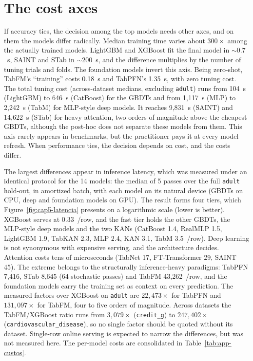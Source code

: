 \section{The cost axes}
\label{sec:cap5-ato2}
\label{sec:cap5-custos}

If accuracy ties, the decision among the top models needs other axes,
and on them the models differ radically. Median training
time varies about $300\times$ among the actually trained models. LightGBM and XGBoost fit the final model in ${\sim}0.7$~s,
SAINT and STab in ${\sim}200$~s, and the difference multiplies by the
number of tuning trials and folds. The foundation models invert this
axis. Being zero-shot, TabFM's ``training'' costs 0.18~s
and TabPFN's 1.35~s, with zero tuning cost. The total tuning cost
(across-dataset medians, excluding \texttt{adult}) runs from
104~s (LightGBM) to 646~s (CatBoost) for the GBDTs and from 1{,}117~s
(MLP) to 2{,}242~s (TabM) for MLP-style deep models. It reaches
9{,}831~s (SAINT) and 14{,}622~s (STab) for heavy attention,
two orders of magnitude above the cheapest GBDTs,
although the post-hoc does not separate these models from them.
This axis rarely appears in benchmarks, but the practitioner pays it
at every model refresh. When performance ties, the decision depends on cost, and the costs differ.

The largest differences appear in inference latency, which was
measured under an identical protocol for the 14 models: the median
of 5 passes over the full \texttt{adult} hold-out, in amortized batch,
with each model on its natural device (GBDTs on CPU, deep and
foundation models on GPU). The result forms four tiers, which
Figure~\ref{fig:cap5-latencia} presents on a logarithmic scale (lower
is better). XGBoost serves at 0.33~\us/row, and the fast tier holds
the other GBDTs, the MLP-style deep models and the two KANs (CatBoost
1.4, RealMLP 1.5, LightGBM 1.9, TabKAN 2.3, MLP 2.4, KAN 3.1, TabM
3.5~\us/row). Deep learning is not synonymous with expensive
serving, and the architecture decides. Attention costs tens
of microseconds (TabNet 17, FT-Transformer 29, SAINT 45). The extreme
belongs to the structurally inference-heavy paradigms: TabPFN
7{,}416, STab 8{,}645 (64 stochastic passes) and TabFM
43{,}262~\us/row, and the foundation models
carry the training set as context on every prediction. The measured
factors over XGBoost on \texttt{adult} are $22{,}473\times$ for TabPFN
and $131{,}097\times$ for TabFM, four to five orders of
magnitude. Across datasets the TabFM/XGBoost ratio runs from
$3{,}079\times$ (\texttt{credit\_g}) to
$247{,}402\times$ (\texttt{cardiovascular\_\allowbreak disease}), so no
single factor should be quoted without its dataset. Single-row online
serving is expected to narrow the differences, but was not measured
here. The per-model costs are consolidated in
Table~\ref{tab:app-custos}.

